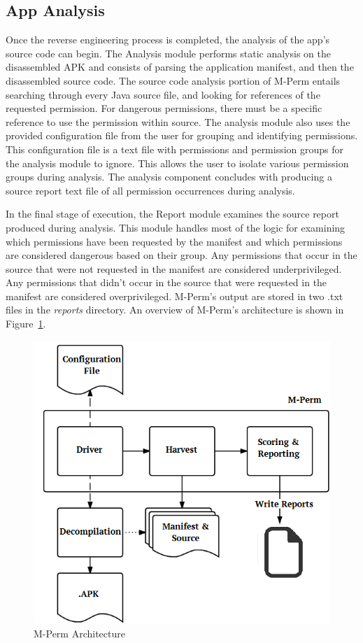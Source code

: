 \documentclass{sig-alternate-05-2015}
\newcommand{\todo}[1]{\textcolor{cyan}{\textbf{[#1]}}}
\begin{document}
\subsection{App Analysis}

Once the reverse engineering process is completed, the analysis of the app's source code can begin. The Analysis module performs static analysis on the disassembled APK and consists of parsing the application manifest, and then the disassembled source code. The source code analysis portion of M-Perm entails searching through every Java source file, and looking for references of the requested permission. For dangerous permissions, there must be a specific reference to use the permission within source. The analysis module also uses the provided configuration file from the user for grouping and identifying permissions. This configuration file is a text file with permissions and permission groups for the analysis module to ignore. This allows the user to isolate various permission groups during analysis. The analysis component concludes with producing a source report text file of all permission occurrences during analysis.

In the final stage of execution, the Report module examines the source report produced during analysis. This module handles most of the logic for examining which permissions have been requested by the manifest and which permissions are considered dangerous based on their group. Any permissions that occur in the source that were not requested in the manifest are considered underprivileged. Any permissions that didn't occur in the source that were requested in the manifest are considered overprivileged. M-Perm's output are stored in two .txt files in the \emph{reports} directory. An overview of M-Perm's architecture is shown in Figure~\ref{fig:architecture}.


\begin{figure}[ht!]
\centering
\includegraphics[width=\columnwidth, angle = 0, scale=.99]{images/architecture.png}
\caption{M-Perm Architecture} %
\label{fig:architecture}
\end{figure}
\end{document}
